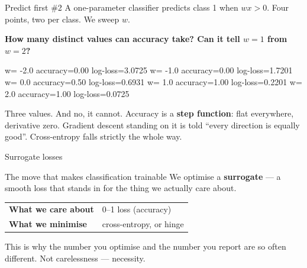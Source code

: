 \documentclass[aspectratio=169]{beamer}
\begin{document}
\begin{frame}[fragile]{Predict first \#2}
A one-parameter classifier predicts class 1 when $wx>0$. Four points,
two per class. We sweep $w$.

\begin{center}
  \textbf{How many distinct values can accuracy take?
  Can it tell $w{=}1$ from $w{=}2$?}
\end{center}
\vspace{0.4em}
\begin{outblk}
w= -2.0  accuracy=0.00  log-loss=3.0725
w= -1.0  accuracy=0.00  log-loss=1.7201
w=  0.0  accuracy=0.50  log-loss=0.6931
w=  1.0  accuracy=1.00  log-loss=0.2201
w=  2.0  accuracy=1.00  log-loss=0.0725
\end{outblk}
\begin{alertblock}{Three values. And no, it cannot.}
  \small Accuracy is a \textbf{step function}: flat everywhere, derivative
  zero. Gradient descent standing on it is told ``every direction is equally
  good''. Cross-entropy falls strictly the whole way.
\end{alertblock}
\end{frame}

\begin{frame}{Surrogate losses}
  \begin{exampleblock}{The move that makes classification trainable}
    We optimise a \textbf{surrogate} --- a smooth loss that stands in for the
    thing we actually care about.
  \end{exampleblock}
  \vspace{0.6em}
  \begin{center}
  \begin{tabular}{@{}ll@{}}
    \toprule
    \textbf{What we care about} & 0--1 loss (accuracy)\\
    \textbf{What we minimise}   & cross-entropy, or hinge\\
    \bottomrule
  \end{tabular}
  \end{center}
  \vspace{0.8em}
  \begin{center}
    \small This is why the number you optimise and the number you report are
    so often different. Not carelessness --- necessity.
  \end{center}
\end{frame}
\end{document}
